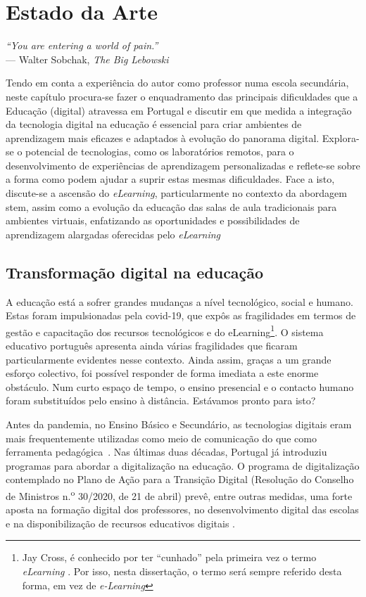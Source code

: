 \chapter{Estado da Arte}
\label{Capitulo2}

\begin{flushright}
\textit{``You are entering a world of pain.''} \\[0.5em]
--- Walter Sobchak, \textit{The Big Lebowski}
\end{flushright}
Tendo em conta a experiência do autor como professor numa escola secundária, neste capítulo procura-se fazer o enquadramento das principais dificuldades que a Educação (digital) atravessa em Portugal e discutir em que medida a integração da tecnologia digital na educação é essencial para criar ambientes de aprendizagem mais eficazes e adaptados à evolução do panorama digital. Explora-se o potencial de tecnologias, como os laboratórios remotos, para o desenvolvimento de experiências de aprendizagem personalizadas e reflete-se sobre a forma como podem ajudar a suprir estas mesmas dificuldades.
Face a isto, discute-se a ascensão do \textit{eLearning}, particularmente no contexto da abordagem \acrshort{stem}, assim como a evolução da educação das salas de aula tradicionais para ambientes virtuais, enfatizando as oportunidades e possibilidades de aprendizagem alargadas oferecidas pelo \textit{eLearning}

\section{Transformação digital na educação}
\label{sec:transformaçãodigital}
A educação está a sofrer grandes mudanças a nível tecnológico, social e humano. Estas foram impulsionadas pela \acrfull{covid-19}, que expôs as fragilidades em termos de gestão e capacitação dos recursos tecnológicos e do eLearning\footnote{Jay Cross, é conhecido por ter ``cunhado'' pela primeira vez o termo \textit{eLearning} \cite{jaycross}. Por isso, nesta dissertação, o termo será sempre referido desta forma, em vez de \textit{e-Learning}}. O sistema educativo português apresenta ainda várias fragilidades que ficaram particularmente evidentes nesse contexto. Ainda assim, graças a um grande esforço colectivo, foi possível responder de forma imediata a este enorme obstáculo. Num curto espaço de tempo, o ensino presencial e o contacto humano foram substituídos pelo ensino à distância. Estávamos pronto para isto?

Antes da pandemia, no Ensino Básico e Secundário, as tecnologias digitais eram mais frequentemente utilizadas como meio de comunicação do que como ferramenta pedagógica~\cite{oecd_using_2021}. Nas últimas duas décadas, Portugal já introduziu programas para abordar a digitalização na educação. O programa de digitalização contemplado no Plano de Ação para a Transição Digital (Resolução do Conselho de Ministros n.\textsuperscript{o} 30/2020, de 21 de abril) prevê, entre outras medidas, uma forte aposta na formação digital dos professores, no desenvolvimento digital das escolas e na disponibilização de recursos educativos digitais \cite{transicaodigital, capacitacaodigital}.

